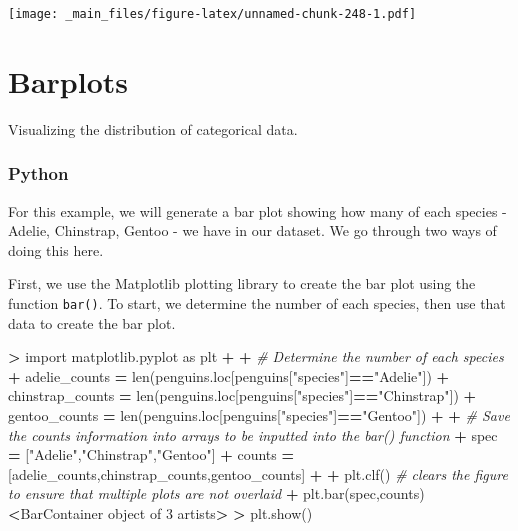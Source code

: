 \documentclass[
]{book}
\newenvironment{Shaded}{\begin{snugshade}}{\end{snugshade}}
\newcommand{\BuiltInTok}[1]{#1}
\newcommand{\CommentTok}[1]{\textcolor[rgb]{0.56,0.35,0.01}{\textit{#1}}}
\newcommand{\DecValTok}[1]{\textcolor[rgb]{0.00,0.00,0.81}{#1}}
\newcommand{\ImportTok}[1]{#1}
\newcommand{\NormalTok}[1]{#1}
\newcommand{\OperatorTok}[1]{\textcolor[rgb]{0.81,0.36,0.00}{\textbf{#1}}}
\newcommand{\StringTok}[1]{\textcolor[rgb]{0.31,0.60,0.02}{#1}}
\begin{document}
\texttt{[image: \_main\_files/figure-latex/unnamed-chunk-248-1.pdf]}

\hypertarget{barplots}{%
\section{Barplots}\label{barplots}}

Visualizing the distribution of categorical data.

\hypertarget{python-40}{%
\subsubsection*{Python}\label{python-40}}

For this example, we will generate a bar plot showing how many of each species - Adelie, Chinstrap, Gentoo - we have in our dataset. We go through two ways of doing this here.

First, we use the Matplotlib plotting library to create the bar plot using the function \texttt{bar()}. To start, we determine the number of each species, then use that data to create the bar plot.

\begin{Shaded}
\begin{Highlighting}[]
\OperatorTok{\textgreater{}} \ImportTok{import}\NormalTok{ matplotlib.pyplot }\ImportTok{as}\NormalTok{ plt }
\OperatorTok{+} 
\OperatorTok{+} \CommentTok{\# Determine the number of each species}
\OperatorTok{+}\NormalTok{ adelie\_counts }\OperatorTok{=} \BuiltInTok{len}\NormalTok{(penguins.loc[penguins[}\StringTok{"species"}\NormalTok{]}\OperatorTok{==}\StringTok{"Adelie"}\NormalTok{])}
\OperatorTok{+}\NormalTok{ chinstrap\_counts }\OperatorTok{=} \BuiltInTok{len}\NormalTok{(penguins.loc[penguins[}\StringTok{"species"}\NormalTok{]}\OperatorTok{==}\StringTok{"Chinstrap"}\NormalTok{])}
\OperatorTok{+}\NormalTok{ gentoo\_counts }\OperatorTok{=} \BuiltInTok{len}\NormalTok{(penguins.loc[penguins[}\StringTok{"species"}\NormalTok{]}\OperatorTok{==}\StringTok{"Gentoo"}\NormalTok{])}
\OperatorTok{+} 
\OperatorTok{+} \CommentTok{\# Save the counts information into arrays to be inputted into the bar() function}
\OperatorTok{+}\NormalTok{ spec }\OperatorTok{=}\NormalTok{ [}\StringTok{"Adelie"}\NormalTok{,}\StringTok{"Chinstrap"}\NormalTok{,}\StringTok{"Gentoo"}\NormalTok{]}
\OperatorTok{+}\NormalTok{ counts }\OperatorTok{=}\NormalTok{ [adelie\_counts,chinstrap\_counts,gentoo\_counts]}
\OperatorTok{+} 
\OperatorTok{+}\NormalTok{ plt.clf() }\CommentTok{\# clears the figure to ensure that multiple plots are not overlaid}
\OperatorTok{+}\NormalTok{ plt.bar(spec,counts)}
\OperatorTok{\textless{}}\NormalTok{BarContainer }\BuiltInTok{object}\NormalTok{ of }\DecValTok{3}\NormalTok{ artists}\OperatorTok{\textgreater{}}
\OperatorTok{\textgreater{}}\NormalTok{ plt.show()}
\end{Highlighting}
\end{Shaded}
\end{document}
